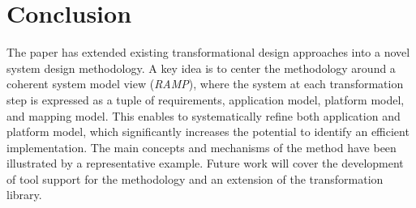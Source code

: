 \section{Conclusion}
\label{sec:conclusion}
The paper has extended existing transformational design approaches into a novel system design methodology. A key idea is to center the methodology around a coherent system model view (\textit{RAMP}), where the system at each transformation step is expressed as a tuple of requirements, application model, platform model, and mapping model. This enables to systematically refine both application and platform model, which significantly increases the potential to identify an efficient implementation. The main concepts and mechanisms of the method have been illustrated by a representative example. Future work will cover the development of tool support for the methodology and an extension of the transformation library.
